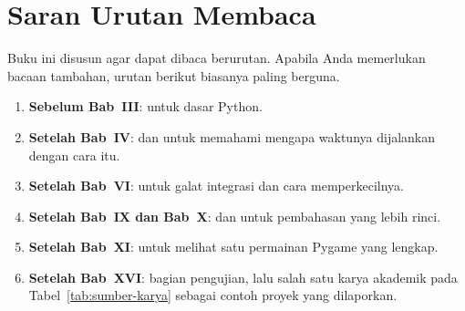 \section{Saran Urutan Membaca}

Buku ini disusun agar dapat dibaca berurutan. Apabila Anda memerlukan bacaan
tambahan, urutan berikut biasanya paling berguna.

\begin{enumerate}
  \item \textbf{Sebelum Bab~III}: \cite{sweigart-invent} untuk dasar Python.
  \item \textbf{Setelah Bab~IV}: \cite{nystrom-gameloop} dan
        \cite{fiedler-timestep} untuk memahami mengapa waktunya dijalankan
        dengan cara itu.
  \item \textbf{Setelah Bab~VI}: \cite{catto-integration} untuk galat
        integrasi dan cara memperkecilnya.
  \item \textbf{Setelah Bab~IX dan Bab~X}: \cite{santos-fsm} dan
        \cite{santos-pathfinding} untuk pembahasan yang lebih rinci.
  \item \textbf{Setelah Bab~XI}: \cite{sweigart-mg} untuk melihat satu
        permainan Pygame yang lengkap.
  \item \textbf{Setelah Bab~XVI}: \cite{unity-leveldesign} bagian pengujian,
        lalu salah satu karya akademik pada Tabel~\ref{tab:sumber-karya}
        sebagai contoh proyek yang dilaporkan.
\end{enumerate}
